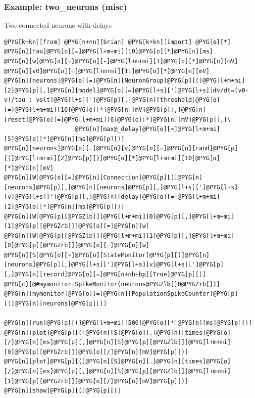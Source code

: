 \documentclass[letterpaper,10pt,english]{manual}
\begin{document}
\resetcurrentobjects
\hypertarget{--doc-examples-misc_two_neurons}{}

\hypertarget{index-73}{}\subsubsection{Example: two\_neurons (misc)}

Two connected neurons with delays

\begin{Verbatim}[commandchars=@\[\]]
@PYG[k+kn][from] @PYG[n+nn][brian] @PYG[k+kn][import] @PYG[o][*]
@PYG[n][tau]@PYG[o][=]@PYG[l+m+mi][10]@PYG[o][*]@PYG[n][ms]
@PYG[n][w]@PYG[o][=]@PYG[o][-]@PYG[l+m+mi][1]@PYG[o][*]@PYG[n][mV]
@PYG[n][v0]@PYG[o][=]@PYG[l+m+mi][11]@PYG[o][*]@PYG[n][mV]
@PYG[n][neurons]@PYG[o][=]@PYG[n][NeuronGroup]@PYG[p][(]@PYG[l+m+mi][2]@PYG[p][,]@PYG[n][model]@PYG[o][=]@PYG[l+s][']@PYG[l+s][dv/dt=(v0-v)/tau : volt]@PYG[l+s][']@PYG[p][,]@PYG[n][threshold]@PYG[o][=]@PYG[l+m+mi][10]@PYG[o][*]@PYG[n][mV]@PYG[p][,]@PYG[n][reset]@PYG[o][=]@PYG[l+m+mi][0]@PYG[o][*]@PYG[n][mV]@PYG[p][,]\
                    @PYG[n][max@_delay]@PYG[o][=]@PYG[l+m+mi][5]@PYG[o][*]@PYG[n][ms]@PYG[p][)]
@PYG[n][neurons]@PYG[o][.]@PYG[n][v]@PYG[o][=]@PYG[n][rand]@PYG[p][(]@PYG[l+m+mi][2]@PYG[p][)]@PYG[o][*]@PYG[l+m+mi][10]@PYG[o][*]@PYG[n][mV]
@PYG[n][W]@PYG[o][=]@PYG[n][Connection]@PYG[p][(]@PYG[n][neurons]@PYG[p][,]@PYG[n][neurons]@PYG[p][,]@PYG[l+s][']@PYG[l+s][v]@PYG[l+s][']@PYG[p][,]@PYG[n][delay]@PYG[o][=]@PYG[l+m+mi][2]@PYG[o][*]@PYG[n][ms]@PYG[p][)]
@PYG[n][W]@PYG[p][@PYGZlb[]]@PYG[l+m+mi][0]@PYG[p][,]@PYG[l+m+mi][1]@PYG[p][@PYGZrb[]]@PYG[o][=]@PYG[n][w]
@PYG[n][W]@PYG[p][@PYGZlb[]]@PYG[l+m+mi][1]@PYG[p][,]@PYG[l+m+mi][0]@PYG[p][@PYGZrb[]]@PYG[o][=]@PYG[n][w]
@PYG[n][S]@PYG[o][=]@PYG[n][StateMonitor]@PYG[p][(]@PYG[n][neurons]@PYG[p][,]@PYG[l+s][']@PYG[l+s][v]@PYG[l+s][']@PYG[p][,]@PYG[n][record]@PYG[o][=]@PYG[n+nb+bp][True]@PYG[p][)]
@PYG[c][@#mymonitor=SpikeMonitor(neurons@PYGZlb[]0@PYGZrb[])]
@PYG[n][mymonitor]@PYG[o][=]@PYG[n][PopulationSpikeCounter]@PYG[p][(]@PYG[n][neurons]@PYG[p][)]

@PYG[n][run]@PYG[p][(]@PYG[l+m+mi][500]@PYG[o][*]@PYG[n][ms]@PYG[p][)]
@PYG[n][plot]@PYG[p][(]@PYG[n][S]@PYG[o][.]@PYG[n][times]@PYG[o][/]@PYG[n][ms]@PYG[p][,]@PYG[n][S]@PYG[p][@PYGZlb[]]@PYG[l+m+mi][0]@PYG[p][@PYGZrb[]]@PYG[o][/]@PYG[n][mV]@PYG[p][)]
@PYG[n][plot]@PYG[p][(]@PYG[n][S]@PYG[o][.]@PYG[n][times]@PYG[o][/]@PYG[n][ms]@PYG[p][,]@PYG[n][S]@PYG[p][@PYGZlb[]]@PYG[l+m+mi][1]@PYG[p][@PYGZrb[]]@PYG[o][/]@PYG[n][mV]@PYG[p][)]
@PYG[n][show]@PYG[p][(]@PYG[p][)]
\end{Verbatim}
\end{document}
